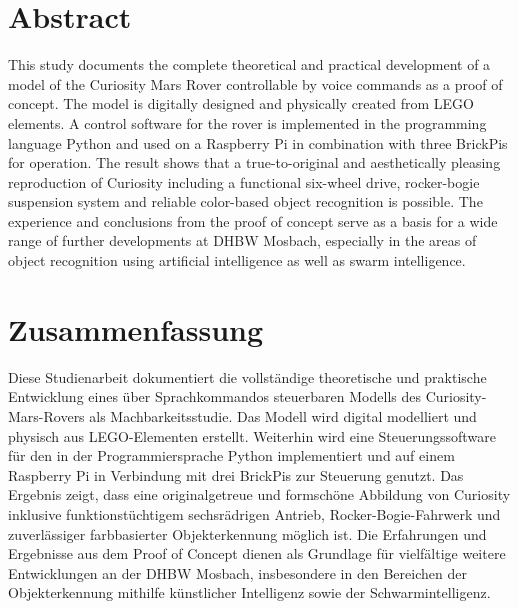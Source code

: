 \chapter{Abstract}
\label{sec:abstractenglish}

This study documents the complete theoretical and practical development of a model of the Curiosity Mars Rover controllable by voice commands as a proof of concept.
The model is digitally designed and physically created from LEGO elements.
A control software for the rover is implemented in the programming language Python and used on a Raspberry Pi in combination with three BrickPis for operation.
The result shows that a true-to-original and aesthetically pleasing reproduction of Curiosity including a functional six-wheel drive, rocker-bogie suspension system and reliable color-based object recognition is possible.
The experience and conclusions from the proof of concept serve as a basis for a wide range of further developments at DHBW Mosbach, especially in the areas of object recognition using artificial intelligence as well as swarm intelligence.

\vspace{1cm}

\begingroup
\renewcommand{\pagebreak}{}
\renewcommand{\clearpage}{}
\chapter*{Zusammenfassung}
\label{sec:abstract}

Diese Studienarbeit dokumentiert die vollständige theoretische und praktische Entwicklung eines über Sprachkommandos steuerbaren Modells des Curiosity-Mars-Rovers als Machbarkeitsstudie.
Das Modell wird digital modelliert und physisch aus LEGO-Elementen erstellt.
Weiterhin wird eine Steuerungssoftware für den in der Programmiersprache Python implementiert und auf einem Raspberry Pi in Verbindung mit drei BrickPis zur Steuerung genutzt.
Das Ergebnis zeigt, dass eine originalgetreue und formschöne Abbildung von Curiosity inklusive funktionstüchtigem sechsrädrigen Antrieb, Rocker-Bogie-Fahrwerk und zuverlässiger farbbasierter Objekterkennung möglich ist.
Die Erfahrungen und Ergebnisse aus dem Proof of Concept dienen als Grundlage für vielfältige weitere Entwicklungen an der DHBW Mosbach, insbesondere in den Bereichen der Objekterkennung mithilfe künstlicher Intelligenz sowie der Schwarmintelligenz.

\endgroup